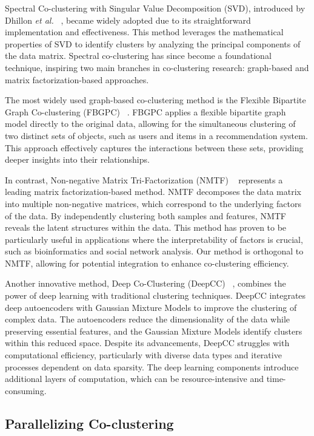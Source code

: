 \documentclass[journal]{IEEEtran}
\renewcommand{\cite}[1]{~\autocite{#1}}
\begin{document}
Spectral Co-clustering with Singular Value Decomposition (SVD), introduced by Dhillon \textit{et al.} \cite{dhillon2001CoclusteringDocumentsWords}, became widely adopted due to its straightforward implementation and effectiveness. This method leverages the mathematical properties of SVD to identify clusters by analyzing the principal components of the data matrix. Spectral co-clustering has since become a foundational technique, inspiring two main branches in co-clustering research: graph-based and matrix factorization-based approaches.

The most widely used graph-based co-clustering method is the Flexible Bipartite Graph Co-clustering (FBGPC) \cite{chen2023FastFlexibleBipartitea}. FBGPC applies a flexible bipartite graph model directly to the original data, allowing for the simultaneous clustering of two distinct sets of objects, such as users and items in a recommendation system. This approach effectively captures the interactions between these sets, providing deeper insights into their relationships.

In contrast, Non-negative Matrix Tri-Factorization (NMTF) \cite{long2005CoclusteringBlockValue} represents a leading matrix factorization-based method. NMTF decomposes the data matrix into multiple non-negative matrices, which correspond to the underlying factors of the data. By independently clustering both samples and features, NMTF reveals the latent structures within the data. This method has proven to be particularly useful in applications where the interpretability of factors is crucial, such as bioinformatics and social network analysis. Our method is orthogonal to NMTF, allowing for potential integration to enhance co-clustering efficiency.

Another innovative method, Deep Co-Clustering (DeepCC) \cite{dongkuanxu2019DeepCoClustering}, combines the power of deep learning with traditional clustering techniques. DeepCC integrates deep autoencoders with Gaussian Mixture Models to improve the clustering of complex data. The autoencoders reduce the dimensionality of the data while preserving essential features, and the Gaussian Mixture Models identify clusters within this reduced space. Despite its advancements, DeepCC struggles with computational efficiency, particularly with diverse data types and iterative processes dependent on data sparsity. The deep learning components introduce additional layers of computation, which can be resource-intensive and time-consuming.

\subsection{Parallelizing Co-clustering}
\end{document}
